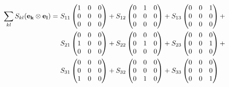 \documentclass[11pt]{article}
\begin{document}
\begin{landscape}
\begin{align}
\sum_{kl} S_{kl} ({\bf{e_k}} \otimes {\bf{e_l}}) = & \
  S_{11}\begin{pmatrix}
 1 & 0 & 0 \\
 0 & 0 & 0 \\
 0 & 0 & 0 
       \end{pmatrix} +        
  S_{12}\begin{pmatrix}
 0 & 1 & 0 \\
 0 & 0 & 0 \\
 0 & 0 & 0 
       \end{pmatrix} +
  S_{13}\begin{pmatrix}
 0 & 0 & 1 \\
 0 & 0 & 0 \\
 0 & 0 & 0 
       \end{pmatrix} + \\
  & \ S_{21}\begin{pmatrix}
 0 & 0 & 0 \\
 1 & 0 & 0 \\
 0 & 0 & 0 
       \end{pmatrix} +        
  S_{22}\begin{pmatrix}
 0 & 0 & 0 \\
 0 & 1 & 0 \\
 0 & 0 & 0 
       \end{pmatrix} +
  S_{23}\begin{pmatrix}
 0 & 0 & 0 \\
 0 & 0 & 1 \\
 0 & 0 & 0 
       \end{pmatrix} + \\
 & \ S_{31}\begin{pmatrix}
 0 & 0 & 0 \\
 0 & 0 & 0 \\
 1 & 0 & 0 
       \end{pmatrix} +        
  S_{32}\begin{pmatrix}
 0 & 0 & 0 \\
 0 & 0 & 0 \\
 0 & 1 & 0 
       \end{pmatrix} +
  S_{33}\begin{pmatrix}
 0 & 0 & 0 \\
 0 & 0 & 0 \\
 0 & 0 & 1 
       \end{pmatrix} 
\end{align}




\newpage


\end{landscape}
\end{document}
